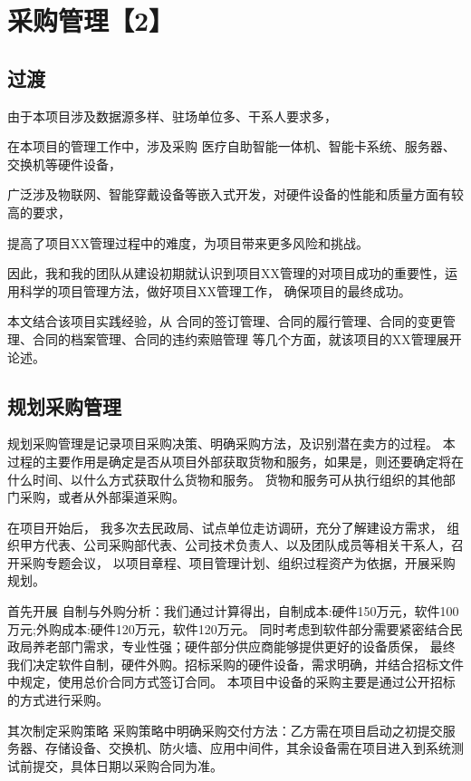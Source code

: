 \documentclass[UTF8]{../computerUniverse}
\begin{document}
\chapter{采购管理【2】}

\section{过渡}

由于本项目涉及数据源多样、驻场单位多、干系人要求多，

在本项目的管理工作中，涉及采购
医疗自助智能一体机、智能卡系统、服务器、交换机等硬件设备，

广泛涉及物联网、智能穿戴设备等嵌入式开发，对硬件设备的性能和质量方面有较高的要求，

提高了项目XX管理过程中的难度，为项目带来更多风险和挑战。

因此，我和我的团队从建设初期就认识到项目XX管理的对项目成功的重要性，运用科学的项目管理方法，做好项目XX管理工作，
确保项目的最终成功。

本文结合该项目实践经验，从
合同的签订管理、合同的履行管理、合同的变更管理、合同的档案管理、合同的违约索赔管理
等几个方面，就该项目的XX管理展开论述。


\section{规划采购管理}

规划采购管理是记录项目采购决策、明确采购方法，及识别潜在卖方的过程。
本过程的主要作用是确定是否从项目外部获取货物和服务，如果是，则还要确定将在什么时间、以什么方式获取什么货物和服务。
货物和服务可从执行组织的其他部门采购，或者从外部渠道采购。


在项目开始后，
我多次去民政局、试点单位走访调研，充分了解建设方需求，
组织甲方代表、公司采购部代表、公司技术负责人、以及团队成员等相关干系人，召开采购专题会议，
以项目章程、项目管理计划、组织过程资产为依据，开展采购规划。

首先开展
自制与外购分析：我们通过计算得出，自制成本:硬件150万元，软件100万元;外购成本:硬件120万元，软件120万元。
同时考虑到软件部分需要紧密结合民政局养老部门需求，专业性强；硬件部分供应商能够提供更好的设备质保，
最终我们决定软件自制，硬件外购。招标采购的硬件设备，需求明确，并结合招标文件中规定，使用总价合同方式签订合同。
本项目中设备的采购主要是通过公开招标的方式进行采购。

其次制定采购策略
采购策略中明确采购交付方法：乙方需在项目启动之初提交服务器、存储设备、交换机、防火墙、应用中间件，其余设备需在项目进入到系统测试前提交，具体日期以采购合同为准。
\end{document}
